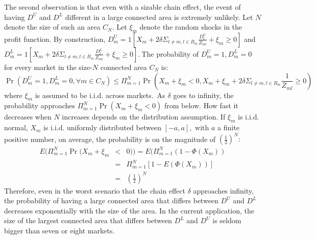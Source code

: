 \documentclass[notitlepage,onecolumn,11pt]{article}
\begin{document}
The second observation is that even with a sizable chain effect, the event
of having $D^{U}$ and $D^{L}$ different in a large connected area is
extremely unlikely. Let $N$ denote the size of such an area $C_{N}.$ Let $%
\xi _{m}$ denote the random shocks in the profit function. By construction, $%
D_{m}^{U}=1[X_{m}+2\delta \Sigma _{l\neq m,l\in B_{m}}\frac{D_{l}^{U}}{Z_{ml}%
}+\xi _{m}\geq 0]$ and $D_{m}^{L}=1[X_{m}+2\delta \Sigma _{l\neq m,l\in
B_{m}}\frac{D_{l}^{L}}{Z_{ml}}+\xi _{m}\geq 0].~$The probability of $%
D_{m}^{U}=1,D_{m}^{L}=0$ for every market in the size-$N$ connected area $%
C_{N}$ is:%
\begin{equation*}
\Pr (D_{m}^{U}=1,D_{m}^{L}=0,\forall m\in C_{N})\leq \Pi _{m=1}^{N}\Pr
(X_{m}+\xi _{m}<0,X_{m}+\xi _{m}+2\delta \Sigma _{l\neq m,l\in B_{m}}\frac{1%
}{Z_{ml}}\geq 0)
\end{equation*}%
where $\xi _{m}$ is assumed to be i.i.d. across markets$.$\ As $\delta $
goes to infinity, the probability approaches $\Pi _{m=1}^{N}\Pr (X_{m}+\xi
_{m}<0)$ from below. How fast it decreases when $N$ increases depends on the
distribution assumption$.$ If $\xi _{m}$ is i.i.d. normal, $X_{m}$ is i.i.d.
uniformly distributed between $[-a,a],$ with $a$ a finite positive number,
on average, the probability is on the magnitude of $(\frac{1}{2})^{N}:$%
\begin{eqnarray*}
E(\Pi _{m=1}^{N}\Pr (X_{m}+\xi _{m} &<&0))=E(\Pi _{m=1}^{N}(1-\Phi (X_{m}))
\\
&=&\Pi _{m=1}^{N}[1-E(\Phi (X_{m}))] \\
&=&(\frac{1}{2})^{N}
\end{eqnarray*}%
Therefore, even in the worst scenario that the chain effect $\delta $
approaches infinity, the probability of having a large connected area that
differs between $D^{U}$ and $D^{L}$ decreases exponentially with the size of
the area. In the current application, the size of the largest connected area
that differs between $D^{L}$ and $D^{U}$ is seldom bigger than seven or
eight markets.
\end{document}
